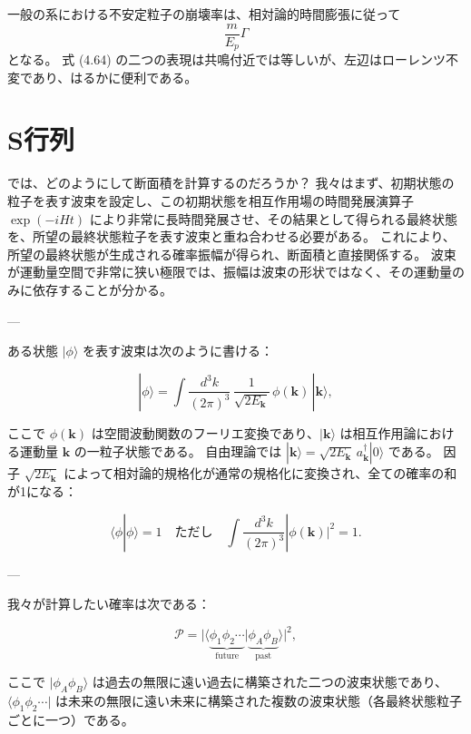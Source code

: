 \documentclass[a4paper,12pt]{article}
\begin{document}
一般の系における不安定粒子の崩壊率は、相対論的時間膨張に従って
\[
\frac{m}{E_p}\Gamma
\]
となる。  
式 (4.64) の二つの表現は共鳴付近では等しいが、左辺はローレンツ不変であり、はるかに便利である。

\section*{S行列}

では、どのようにして断面積を計算するのだろうか？  
我々はまず、初期状態の粒子を表す波束を設定し、この初期状態を相互作用場の時間発展演算子 $\exp(-iHt)$ により非常に長時間発展させ、その結果として得られる最終状態を、所望の最終状態粒子を表す波束と重ね合わせる必要がある。  
これにより、所望の最終状態が生成される確率振幅が得られ、断面積と直接関係する。  
波束が運動量空間で非常に狭い極限では、振幅は波束の形状ではなく、その運動量のみに依存することが分かる。  

---

ある状態 $|\phi\rangle$ を表す波束は次のように書ける：

\begin{equation}
|\phi\rangle = \int \frac{d^3k}{(2\pi)^3} \, \frac{1}{\sqrt{2E_{\mathbf{k}}}} \, \phi(\mathbf{k}) \, |\mathbf{k}\rangle,
\tag{4.65}
\end{equation}

ここで $\phi(\mathbf{k})$ は空間波動関数のフーリエ変換であり、$|\mathbf{k}\rangle$ は相互作用論における運動量 $\mathbf{k}$ の一粒子状態である。  
自由理論では $|\mathbf{k}\rangle = \sqrt{2E_{\mathbf{k}}}\, a^\dagger_{\mathbf{k}}|0\rangle$ である。  
因子 $\sqrt{2E_{\mathbf{k}}}$ によって相対論的規格化が通常の規格化に変換され、全ての確率の和が1になる：

\begin{equation}
\langle \phi | \phi \rangle = 1
\quad \text{ただし} \quad
\int \frac{d^3k}{(2\pi)^3} |\phi(\mathbf{k})|^2 = 1.
\tag{4.66}
\end{equation}

---

我々が計算したい確率は次である：

\begin{equation}
\mathcal{P} = \Big|\langle \underbrace{\phi_1 \phi_2 \cdots}_{\text{future}} 
\big| \underbrace{\phi_A \phi_B}_{\text{past}} \rangle \Big|^2,
\tag{4.67}
\end{equation}

ここで $|\phi_A \phi_B\rangle$ は過去の無限に遠い過去に構築された二つの波束状態であり、  
$\langle \phi_1 \phi_2 \cdots |$ は未来の無限に遠い未来に構築された複数の波束状態（各最終状態粒子ごとに一つ）である。  
\end{document}
